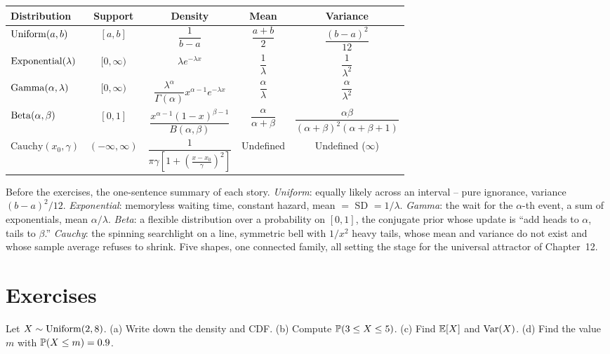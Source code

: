 \begin{center}
\renewcommand{\arraystretch}{1.5}
\begin{tabular}{@{}lcccc@{}}
\toprule
Distribution & Support & Density & Mean & Variance \\
\midrule
$\Unif(a,b)$ & $[a,b]$ & $\dfrac{1}{b-a}$ & $\dfrac{a+b}{2}$ & $\dfrac{(b-a)^2}{12}$ \\
$\Expo(\lambda)$ & $[0,\infty)$ & $\lambda e^{-\lambda x}$ & $\dfrac{1}{\lambda}$ & $\dfrac{1}{\lambda^2}$ \\
$\Gam(\alpha,\lambda)$ & $[0,\infty)$ & $\dfrac{\lambda^\alpha}{\Gamma(\alpha)}x^{\alpha-1}e^{-\lambda x}$ & $\dfrac{\alpha}{\lambda}$ & $\dfrac{\alpha}{\lambda^2}$ \\
$\Bet(\alpha,\beta)$ & $[0,1]$ & $\dfrac{x^{\alpha-1}(1-x)^{\beta-1}}{B(\alpha,\beta)}$ & $\dfrac{\alpha}{\alpha+\beta}$ & $\dfrac{\alpha\beta}{(\alpha+\beta)^2(\alpha+\beta+1)}$ \\
$\text{Cauchy}(x_0,\gamma)$ & $(-\infty,\infty)$ & $\dfrac{1}{\pi\gamma\left[1+\left(\frac{x-x_0}{\gamma}\right)^2\right]}$ & Undefined & Undefined ($\infty$) \\
\bottomrule
\end{tabular}
\end{center}

\begin{recoverybox}
Before the exercises, the one-sentence summary of each story. \emph{Uniform}:
equally likely across an interval -- pure ignorance, variance $(b-a)^2/12$.
\emph{Exponential}: memoryless waiting time, constant hazard, mean $=$ SD $=
1/\lambda$. \emph{Gamma}: the wait for the $\alpha$-th event, a sum of
exponentials, mean $\alpha/\lambda$. \emph{Beta}: a flexible distribution over a
probability on $[0,1]$, the conjugate prior whose update is ``add heads to
$\alpha$, tails to $\beta$.'' \emph{Cauchy}: the spinning searchlight on a line,
symmetric bell with $1/x^2$ heavy tails, whose mean and variance do not exist and
whose sample average refuses to shrink. Five shapes, one connected family, all
setting the stage for the universal attractor of Chapter~12.
\end{recoverybox}

\section{Exercises}
\label{ch11:exercises}

\begin{exercise}
\label{ch11:exr-unif}
Let $X\sim\Unif(2,8)$. (a) Write down the density and CDF. (b) Compute
$\P(3 \le X \le 5)$. (c) Find $\E[X]$ and $\Var(X)$. (d) Find the value $m$ with
$\P(X \le m) = 0.9$.
\end{exercise}

